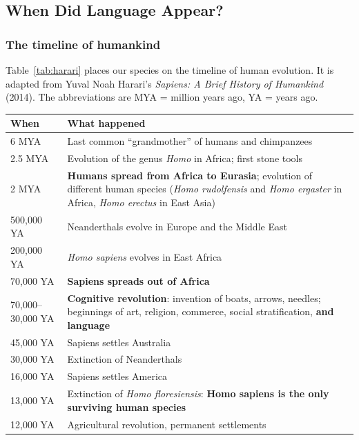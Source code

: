\subsection{When Did Language Appear?}
\label{sec:timeline}

\subsubsection{The timeline of humankind}

Table~\ref{tab:harari} places our species on the timeline of human evolution. It is
adapted from Yuval Noah Harari's \emph{Sapiens: A Brief History of Humankind} (2014).
The abbreviations are MYA = million years ago, YA = years ago.

\begin{center}
\small
\begin{tabularx}{\linewidth}{@{}l X@{}}
\toprule
\textbf{When} & \textbf{What happened} \\
\midrule
6 MYA            & Last common ``grandmother'' of humans and chimpanzees \\
2.5 MYA          & Evolution of the genus \emph{Homo} in Africa; first stone tools \\
2 MYA            & \textbf{Humans spread from Africa to Eurasia}; evolution of different human
                   species (\emph{Homo rudolfensis} and \emph{Homo ergaster} in Africa,
                   \emph{Homo erectus} in East Asia) \\
500{,}000 YA     & Neanderthals evolve in Europe and the Middle East \\
200{,}000 YA     & \emph{Homo sapiens} evolves in East Africa \\
70{,}000 YA      & \textbf{Sapiens spreads out of Africa} \\
70{,}000--30{,}000 YA & \textbf{Cognitive revolution}: invention of boats, arrows, needles;
                   beginnings of art, religion, commerce, social stratification,
                   \textbf{and language} \\
45{,}000 YA      & Sapiens settles Australia \\
30{,}000 YA      & Extinction of Neanderthals \\
16{,}000 YA      & Sapiens settles America \\
13{,}000 YA      & Extinction of \emph{Homo floresiensis}: \textbf{Homo sapiens is the only
                   surviving human species} \\
12{,}000 YA      & Agricultural revolution, permanent settlements \\
\bottomrule
\end{tabularx}
\label{tab:harari}
\end{center}

